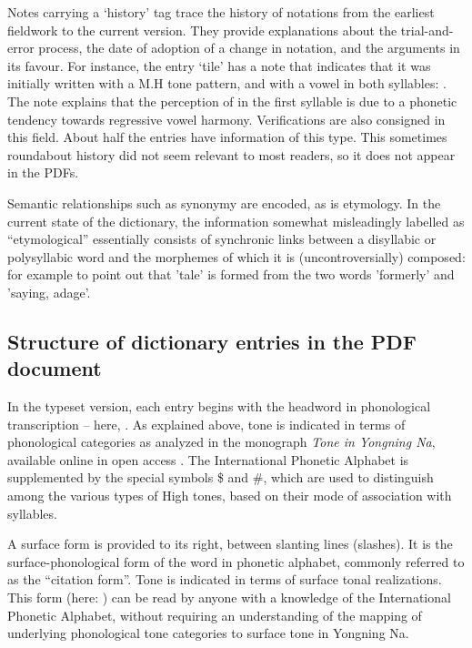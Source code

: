 Notes carrying a ‘history’ tag trace the history of notations from the earliest fieldwork to the current version. They provide explanations about the trial-and-error process, the date of adoption of a change in notation, and the arguments in its favour. For instance, the entry  ‘tile' has a note that indicates that it was initially written with a M.H tone pattern, and with a  vowel in both syllables: . The note explains that the perception of  in the first syllable is due to a phonetic tendency towards regressive vowel harmony. Verifications are also consigned in this field. About half the entries have information of this type. This sometimes roundabout history did not seem relevant to most readers, so it does not appear in the PDFs.

Semantic relationships such as synonymy are encoded, as is etymology. In the current state of the dictionary, the information somewhat misleadingly labelled as “etymological” essentially consists of synchronic links between a disyllabic or polysyllabic word and the morphemes of which it is (uncontroversially) composed: for example to point out that  'tale' is formed from the two words  'formerly' and  'saying, adage'.

\subsection{Structure of dictionary entries in the PDF document}
\label{sec:structure_of_entries}

In the typeset version, each entry begins with the headword in phonological transcription -- here, . As explained above, tone is indicated in terms of phonological categories as analyzed in the monograph \emph{Tone in Yongning Na}, available online in open access \parencite[80-90]{michaud2017}. The International Phonetic Alphabet is supplemented by the special symbols \$ and \#, which are used to distinguish among the various types of High tones, based on their mode of association with syllables.

A surface form is provided to its right, between slanting lines (slashes). It is the surface-phonological form of the word in phonetic alphabet, commonly referred to as the ``citation form''. Tone is indicated in terms of surface tonal realizations. This form (here: ) can be read by anyone with a knowledge of the International Phonetic Alphabet, without requiring an understanding of the mapping of underlying phonological tone categories to surface tone in Yongning Na.

